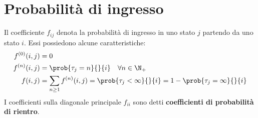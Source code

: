 \documentclass[\main/main.tex]{subfiles}
\begin{document}
\section{Probabilità di ingresso}
\begin{definition}
  Il coefficiente  \(f_{ij}\) denota la probabilità di ingresso in uno stato \(j\) partendo da uno stato \(i\). Essi possiedono alcune caratteristiche:
  \begin{align*}
    f^{(0)}(i,j) & = 0                                                                                            \\
    f^{(n)}(i,j) & = \prob{\tau_j=n}{}{i} \quad \forall n \in \N_+                                                \\
    f(i,j)       & = \sum_{n\geq 1} f^{(n)}(i,j) = \prob{\tau_j < \infty}{}{i}  = 1 - \prob{\tau_j = \infty}{}{i}
  \end{align*}
  I coefficienti sulla diagonale principale \(f_{ii}\) sono detti \textbf{coefficienti di probabilità di rientro}.
\end{definition}
\end{document}
